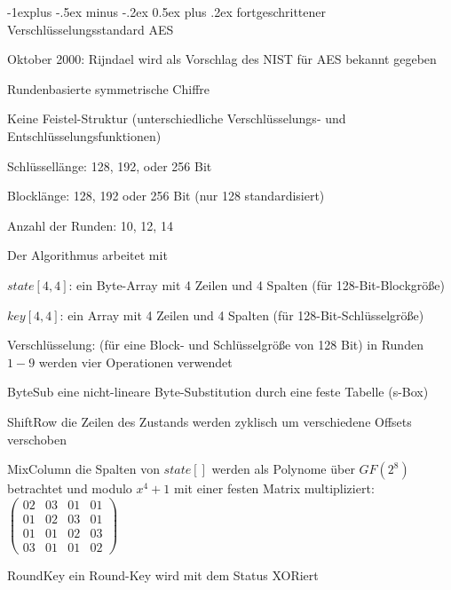 \documentclass[a4paper]{article}
\makeatletter
\renewcommand{\subsection}{\@startsection{subsection}{2}{0mm}%
 {-1explus -.5ex minus -.2ex}%
 {0.5ex plus .2ex}%
 {\normalfont\normalsize\bfseries}}
\makeatother
\begin{document}
\begin{multicols}{3}
      \subsection{fortgeschrittener Verschlüsselungsstandard AES}
      \begin{itemize*}
            \item Oktober 2000: Rijndael wird als Vorschlag des NIST für AES bekannt gegeben
            \item Rundenbasierte symmetrische Chiffre
            \item Keine Feistel-Struktur (unterschiedliche Verschlüsselungs- und Entschlüsselungsfunktionen)
            \item Schlüssellänge: 128, 192, oder 256 Bit
            \item Blocklänge: 128, 192 oder 256 Bit (nur 128 standardisiert)
            \item Anzahl der Runden: 10, 12, 14
            \item Der Algorithmus arbeitet mit
            \begin{itemize*}
                  \item $state[4, 4]$: ein Byte-Array mit 4 Zeilen und 4 Spalten (für 128-Bit-Blockgröße)
                  \item $key[4, 4]$: ein Array mit 4 Zeilen und 4 Spalten (für 128-Bit-Schlüsselgröße)
            \end{itemize*}
            \item Verschlüsselung: (für eine Block- und Schlüsselgröße von 128 Bit) in Runden $1-9$ werden vier Operationen verwendet
            \begin{description*}
                  \item[ByteSub] eine nicht-lineare Byte-Substitution durch eine feste Tabelle (s-Box)
                  \item[ShiftRow] die Zeilen des Zustands werden zyklisch um verschiedene Offsets verschoben
                  \item[MixColumn] die Spalten von $state[]$ werden als Polynome über $GF(2^8)$ betrachtet und modulo $x^4+1$ mit einer festen Matrix multipliziert: $\begin{pmatrix} 02&03&01&01\\ 01&02&03&01 \\ 01&01&02&03\\ 03&01&01&02 \end{pmatrix}$
                  \item[RoundKey] ein Round-Key wird mit dem Status XORiert

\end{description*}
\end{itemize*}
\end{multicols}
\end{document}
